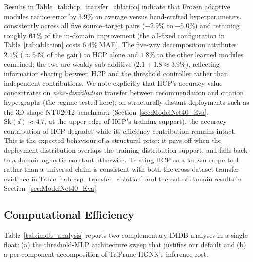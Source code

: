 \documentclass[10pt]{article}
\theoremstyle{plain}
\theoremstyle{definition}
\begin{document}
Results in Table~\ref{tab:hcp_transfer_ablation} indicate that  Frozen adaptive modules reduce error by $\mathbf{3.9\%}$ on average versus hand-crafted hyperparameters, consistently across all five source--target pairs ($-2.9\%$ to $-5.0\%$) and retaining roughly $\mathbf{61\%}$ of the in-domain improvement (the all-fixed configuration in Table~\ref{tab:ablation} costs $6.4\%$ MAE). The five-way decomposition attributes $\mathbf{2.1\%}$ ($\approx\!54\%$ of the gain) to HCP alone and $\mathbf{1.8\%}$ to the other learned modules combined; the two are weakly sub-additive ($2.1\!+\!1.8\!\approx\!3.9\%$), reflecting information sharing between HCP and the threshold controller rather than independent contributions. We note explicitly that HCP's accuracy value concentrates on \emph{near-distribution} transfer between recommendation and citation hypergraphs (the regime tested here); on structurally distant deployments such as the 3D-shape NTU2012 benchmark (Section~\ref{sec:ModelNet40_Eva}, $\mathrm{Sk}(d)\!\approx\!4.7$, at the upper edge of HCP's training support), the accuracy contribution of HCP degrades while its efficiency contribution remains intact. This is the expected behaviour of a structural prior: it pays off when the deployment distribution overlaps the training-distribution support, and falls back to a domain-agnostic constant otherwise. Treating HCP as a known-scope tool rather than a universal claim is consistent with both the cross-dataset transfer evidence in Table~\ref{tab:hcp_transfer_ablation} and the out-of-domain results in Section~\ref{sec:ModelNet40_Eva}. 
\subsection{Computational Efficiency}
\label{sec:efficiency}

Table~\ref{tab:imdb_analysis} reports two complementary IMDB analyses in a single float: (a) the threshold-MLP architecture sweep that justifies our default and (b) a per-component decomposition of TriPrune-HGNN's inference cost. 
\end{document}
